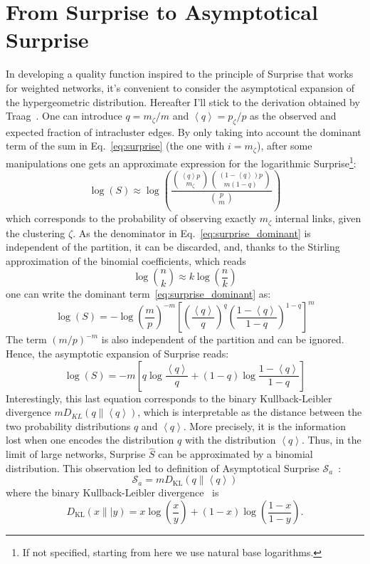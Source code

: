 \section{From Surprise to Asymptotical Surprise}
In developing a quality function inspired to the principle of Surprise that works for weighted networks, it's convenient to consider the asymptotical expansion of the hypergeometric distribution.
Hereafter I'll stick to the derivation obtained by Traag~\cite{traag2015}.
One can introduce $q=m_\zeta/m$ and $\left<q \right>=p_\zeta/p$ as the observed and expected fraction of intracluster edges.
By only taking into account the dominant term of the sum in Eq.~\ref{eq:surprise} (the one with $i=m_\zeta$), after some manipulations one gets an approximate expression for the logarithmic Surprise\footnote{If not specified, starting from here we use natural base logarithms.}:
\begin{equation}\label{eq:surprise_dominant}
\log(S) \approx \log \left( \frac{\binom{\left<q\right> p}{m_\zeta} \binom{(1-\left<q\right>)p}{m(1-q)}}{\binom{p}{m}} \right)
\end{equation}
which corresponds to the probability of observing exactly $m_\zeta$ internal links, given the clustering $\zeta$.
As the denominator in Eq.~\ref{eq:surprise_dominant} is independent of the partition, it can be discarded, and, thanks to the Stirling approximation of the binomial coefficients, which reads 
\begin{equation}
\log \binom{n}{k} \approx k \log \left( \frac{n}{k} \right)
\end{equation}
one can write the dominant term~\ref{eq:surprise_dominant} as:
\begin{equation}
\log(S) = - \log \left(\frac{m}{p}\right)^{-m} \left[ \left(\frac{\left< q\right>}{q}\right)^q \left(\frac{1-\left< q\right>}{1-q}\right)^{1-q} \right]^{m}
\end{equation}
The term $(m/p)^{-m}$ is also independent of the partition and can be ignored.
Hence, the asymptotic expansion of Surprise reads:
\begin{equation}
\log(S) = -m \left[ q \log \frac{\left<q\right>}{q} + (1-q)\log \frac{1-\left<q\right>}{1-q} \right]
\end{equation}
Interestingly, this last equation corresponds to the binary Kullback-Leibler divergence $m D_{KL}(q \| \left< q \right>)$, which is interpretable as the distance between the two probability distributions $q$ and $\left<q\right>$.
More precisely, it is the information lost when one encodes the distribution $q$ with the distribution $\left< q\right>$.
Thus, in the limit of large networks, Surprise $\hat{S}$ can be approximated by a binomial distribution.
This observation led to definition of Asymptotical Surprise $\mathcal{S}_a$~\cite{traag2015}:
\begin{equation}\label{eq:asymptoticalsurprise}
\mathcal{S}_a = m D_{\textrm{KL}}\left( q \| \left< q \right> \right)
\end{equation}
where the binary Kullback-Leibler divergence~\cite{kullback1951,cover2006} is $$D_{\textrm{KL}}(x\|| y) = x \log \left(\frac{x}{y} \right) + (1-x)\log \left (\frac{1-x}{1-y} \right).$$

